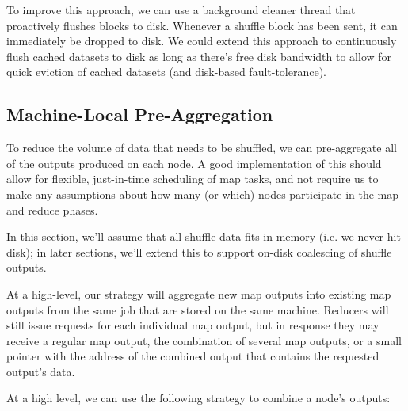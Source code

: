 \documentclass[12pt]{article}
\begin{document}
To improve this approach, we can use a background cleaner thread that
proactively flushes blocks to disk.  Whenever a shuffle block has been sent,
it can immediately be dropped to disk.  We could extend this approach to
continuously flush cached datasets to disk as long as there's free disk
bandwidth to allow for quick eviction of cached datasets (and disk-based
fault-tolerance).

\subsection{Machine-Local Pre-Aggregation}

To reduce the volume of data that needs to be shuffled, we can pre-aggregate
all of the outputs produced on each node.  A good implementation of this
should allow for flexible, just-in-time scheduling of map tasks, and not
require us to make any assumptions about how many (or which) nodes participate
in the map and reduce phases.

In this section, we'll assume that all shuffle data fits in memory (i.e. we
never hit disk); in later sections, we'll extend this to support on-disk
coalescing of shuffle outputs.

At a high-level, our strategy will aggregate new map outputs into existing map
outputs from the same job that are stored on the same machine.  Reducers will
still issue requests for each individual map output, but in response they may
receive a regular map output, the combination of several map outputs, or a
small pointer with the address of the combined output that contains the
requested output's data.

At a high level, we can use the following strategy to combine a node's outputs:
\end{document}
